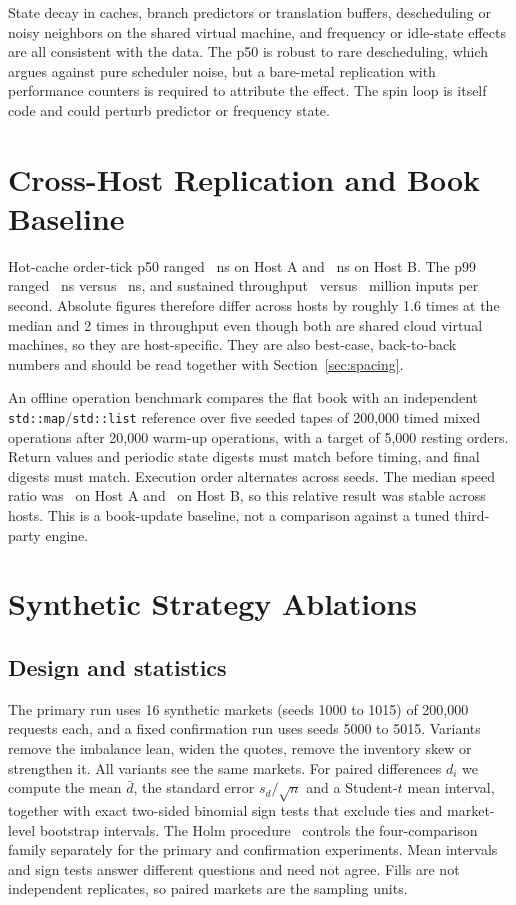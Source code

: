 \documentclass{ieeeaccess}
\begin{document}
State decay in caches, branch predictors or translation buffers, descheduling or noisy neighbors on the shared virtual machine, and frequency or idle-state effects are all consistent with the data. The p50 is robust to rare descheduling, which argues against pure scheduler noise, but a bare-metal replication with performance counters is required to attribute the effect. The spin loop is itself code and could perturb predictor or frequency state.

\section{Cross-Host Replication and Book Baseline}
\label{sec:host}
Hot-cache order-tick p50 ranged \HotMedianRange~ns on Host A and \HostBHotMedianRange~ns on Host B. The p99 ranged \HotPninetyRange~ns versus \HostBHotPninetyRange~ns, and sustained throughput \ThroughputRange\ versus \HostBThroughputRange\ million inputs per second. Absolute figures therefore differ across hosts by roughly 1.6 times at the median and 2 times in throughput even though both are shared cloud virtual machines, so they are host-specific. They are also best-case, back-to-back numbers and should be read together with Section~\ref{sec:spacing}.

An offline operation benchmark compares the flat book with an independent \texttt{std::map}/\texttt{std::list} reference over five seeded tapes of 200{,}000 timed mixed operations after 20{,}000 warm-up operations, with a target of 5{,}000 resting orders. Return values and periodic state digests must match before timing, and final digests must match. Execution order alternates across seeds. The median speed ratio was \BookSpeedup\ on Host A and \HostBBookSpeedup\ on Host B, so this relative result was stable across hosts. This is a book-update baseline, not a comparison against a tuned third-party engine.

\section{Synthetic Strategy Ablations}
\label{sec:ablation}
\subsection{Design and statistics}
The primary run uses 16 synthetic markets (seeds 1000 to 1015) of 200{,}000 requests each, and a fixed confirmation run uses seeds 5000 to 5015. Variants remove the imbalance lean, widen the quotes, remove the inventory skew or strengthen it. All variants see the same markets. For paired differences $d_i$ we compute the mean $\bar d$, the standard error $s_d/\sqrt n$ and a Student-$t$ mean interval, together with exact two-sided binomial sign tests that exclude ties and market-level bootstrap intervals. The Holm procedure~\cite{holm1979} controls the four-comparison family separately for the primary and confirmation experiments. Mean intervals and sign tests answer different questions and need not agree. Fills are not independent replicates, so paired markets are the sampling units.
\end{document}
